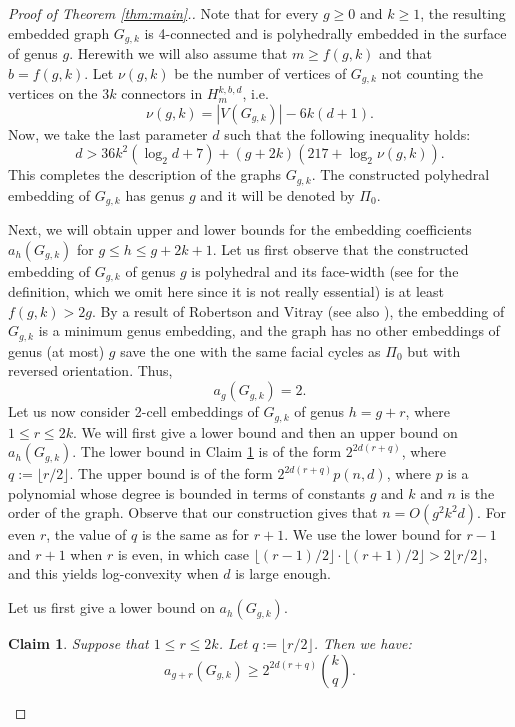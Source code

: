 \documentclass[11pt]{article}
\newtheorem{claim}{Claim}
\begin{document}
\begin{proof}[Proof of Theorem \ref{thm:main}.]
  Note that for every $g\ge0$ and $k\ge1$, the resulting embedded graph $G_{g,k}$ is 4-connected and is polyhedrally embedded in the surface of genus $g$. Herewith we will also assume that $m\ge f(g,k)$ and that $b=f(g,k)$.
  Let $\nu(g,k)$ be the number of vertices of $G_{g,k}$ not counting the vertices on the $3k$ connectors in $H_m^{k,b,d}$, i.e.
  $$\nu(g,k) = |V(G_{g,k})| - 6k(d+1).$$
  Now, we take the last parameter $d$ such that the following inequality holds:
  \begin{equation}\label{eq:d}
    d > 36k^2(\log_2 d + 7) + (g+2k)(217+\log_2 \nu(g,k)).
  \end{equation}
  This completes the description of the graphs $G_{g,k}$.
  The constructed polyhedral embedding of $G_{g,k}$ has genus $g$ and it will be denoted by $\Pi_0$.

  Next, we will obtain upper and lower bounds for the embedding coefficients $a_h(G_{g,k})$ for $g\le h\le g+2k+1$. Let us first observe that the constructed embedding of $G_{g,k}$ of genus $g$ is polyhedral and its face-width (see \cite{MT01} for the definition, which we omit here since it is not really essential) is at least $f(g,k) > 2g$. By a result of Robertson and Vitray \cite{RoVi90} (see also \cite{Mo92}), the embedding of $G_{g,k}$ is a minimum genus embedding, and the graph has no other embeddings of genus (at most) $g$ save the one with the same facial cycles as $\Pi_0$ but with reversed orientation. Thus,
  $$
     a_g(G_{g,k})=2.
  $$
  Let us now consider 2-cell embeddings of $G_{g,k}$ of genus $h=g+r$, where $1 \le r \le 2k$. 
  We will first give a lower bound and then an upper bound on $a_h(G_{g,k})$. The lower bound in Claim \ref{cl:lower bound} is of the form $2^{2d(r+q)}$, where $q:=\lfloor r/2\rfloor$. The upper bound is of the form $2^{2d(r+q)}p(n,d)$, where $p$ is a polynomial whose degree is bounded in terms of constants $g$ and $k$ and $n$ is the order of the graph. Observe that our construction gives that $n=O(g^2 k^2 d)$. For even $r$, the value of $q$ is the same as for $r+1$. We use the lower bound for $r-1$ and $r+1$ when $r$ is even, in which case $\lfloor (r-1)/2\rfloor \cdot \lfloor (r+1)/2\rfloor > 2\lfloor r/2\rfloor$, and this yields log-convexity when $d$ is large enough.

  Let us first give a lower bound on $a_h(G_{g,k})$.

  \begin{claim}\label{cl:lower bound}
     Suppose that $1\le r\le 2k$. Let $q:=\lfloor r/2\rfloor$. Then we have:
     $$
        a_{g+r}(G_{g,k}) \ge 2^{2d(r+q)}\binom{k}{q}.
     $$
  \end{claim}


\end{proof}
\end{document}
